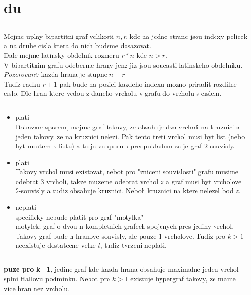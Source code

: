 \documentclass[a4paper]{article}
\begin{document}
\pagestyle{fancy}

\setcounter{section}{1}
\section{du}
\subsection{}
Mejme uplny bipartitni graf velikosti $n,n$ kde na jedne strane jsou indexy policek a
na druhe cisla ktera do nich budeme dosazovat.\\
Dale mejme latinsky obdelnik rozmeru $r*n$ kde $n>r$.\\
V bipartitnim grafu odeberme hrany jenz jiz jsou soucasti latinskeho obdelniku.\\
\textit{Pozorovani:} kazda hrana je stupne $n-r$\\
Tudiz radku $r+1$ pak bude na pozici kazdeho indexu mozno priradit rozdilne cislo.
Dle hran ktere vedou z daneho vrcholu v grafu do vrcholu s cislem. 


\subsection{}
\begin{itemize}
\item plati\\
Dokazme sporem, mejme graf takovy, ze obsahuje dva vrcholi na kruznici a jeden
takovy, ze na kruznici nelezi. Pak tento treti vrchol musi byt list (nebo byt
mostem k listu) a to je ve sporu s predpokladem ze je graf 2-souvisly.

\item plati\\
Takovy vrchol musi existovat, nebot pro "zniceni souvislosti" grafu musime
odebrat 3 vrcholi, takze muzeme odebrat vrchol $z$ a graf musi byt vrcholove
2-souvisly a tudiz obsahuje kruznici. Neboli kruznici na ktere nelezel bod $z$.

\item neplati\\
specificky nebude platit pro graf "motylka"\\
motylek: graf o dvou n-kompletnich grafech spojenych pres jediny vrchol.
Takovy graf bude n-hranove souvisly, ale pouze 1 vrcholove.
Tudiz pro $k>1$ neexistuje dostatecne velke $l$, tudiz tvrzeni neplati.
\end{itemize}


\subsection{}
\textbf{puze pro k=1}, jedine graf kde kazda hrana obsahuje maximalne jeden
vrchol splni Hallovu podminku. Nebot pro $k>1$ existuje hypergraf takovy, ze
mame vice hran nez vrcholu.
\end{document}
